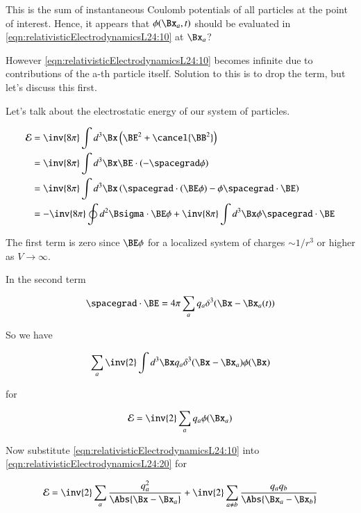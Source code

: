 This is the sum of instantaneous Coulomb potentials of all particles at the point of interest.  Hence, it appears that $\phi(\Bx_a, t)$ should be evaluated in \ref{eqn:relativisticElectrodynamicsL24:10} at $\Bx_a$?

However \ref{eqn:relativisticElectrodynamicsL24:10} becomes infinite due to contributions of the a-th particle itself.  Solution to this is to drop the term, but let's discuss this first.

Let's talk about the electrostatic energy of our system of particles.

\begin{align*}
\mathcal{E} 
&= \inv{8 \pi} \int d^3 \Bx \left(\BE^2 + \cancel{\BB^2} \right) \\
&= \inv{8 \pi} \int d^3 \Bx \BE \cdot (-\spacegrad \phi) \\
&= \inv{8 \pi} \int d^3 \Bx \left( \spacegrad \cdot (\BE \phi) - \phi \spacegrad \cdot \BE \right) \\
&= -\inv{8 \pi} \oint d^2 \Bsigma \cdot \BE \phi + \inv{8 \pi} \int d^3 \Bx \phi \spacegrad \cdot \BE  \\
\end{align*}

The first term is zero since $\BE \phi$ for a localized system of charges $\sim 1/r^3$ or higher as $V \rightarrow \infty$.

In the second term 

\begin{equation}\label{eqn:relativisticElectrodynamicsL24:250}
\spacegrad \cdot \BE = 
4 \pi \sum_a q_a \delta^3(\Bx - \Bx_a(t))
\end{equation}

So we have 

\begin{equation}\label{eqn:relativisticElectrodynamicsL24:270}
\sum_a \inv{2} \int d^3 \Bx q_a \delta^3(\Bx - \Bx_a) \phi(\Bx)
\end{equation}

for

\begin{equation}\label{eqn:relativisticElectrodynamicsL24:20}
\mathcal{E} 
= \inv{2} \sum_a q_a \phi(\Bx_a)
\end{equation}

Now substitute \ref{eqn:relativisticElectrodynamicsL24:10} into \ref{eqn:relativisticElectrodynamicsL24:20} for

\begin{equation}\label{eqn:relativisticElectrodynamicsL24:290}
\mathcal{E} = \inv{2} \sum_a \frac{q_a^2}{\Abs{\Bx - \Bx_a}} + \inv{2} \sum_{a \ne b} \frac{q_a q_b}{\Abs{\Bx_a - \Bx_b}}
\end{equation}

